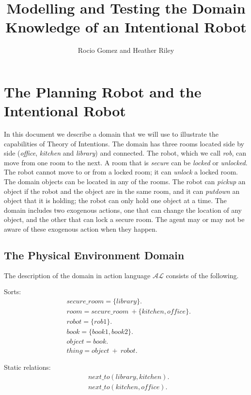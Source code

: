 \documentclass[11pt, oneside]{article}
\title{Modelling and Testing the Domain Knowledge of an Intentional Robot}
\author{Rocio Gomez and Heather Riley}
\begin{document}
\maketitle

\section{The Planning Robot and the Intentional Robot}

In this document we describe a domain that we will use to illustrate
the capabilities of Theory of Intentions. The domain has three rooms
located side by side (\emph{office}, \emph{kitchen} and
\emph{library}) and connected. The robot, which we call \emph{rob},
can move from one room to the next. A room that is \emph{secure} can
be \emph{locked} or \emph{unlocked}. The robot cannot move to or from
a locked room; it can \emph{unlock} a locked room. The domain objects
can be located in any of the rooms. The robot can \emph{pickup} an
object if the robot and the object are in the same room, and it can
\emph{putdown} an object that it is holding; the robot can only hold
one object at a time. The domain includes two exogenous actions, one
that can change the location of any object, and the other that can
lock a secure room. The agent may or may not be aware of these
exogenous action when they happen.


\subsection{The Physical Environment Domain}

The description of the domain in action language $\mathcal{AL}$
consists of the following.

Sorts:
\begin{align*}
  &secure\_room = \{library\}.\\
  &room = secure\_room\ +\{kitchen, office\}.\\
  &robot = \{rob1\}.\\
  &book = \{book1, book2\}.\\
  &object = book.\\
  &thing = object\ +\ robot.
\end{align*}

Static relations:
\begin{align*}
  &next\_to(library, kitchen).\\
  &next\_to(kitchen, office).
\end{align*}
\end{document}

